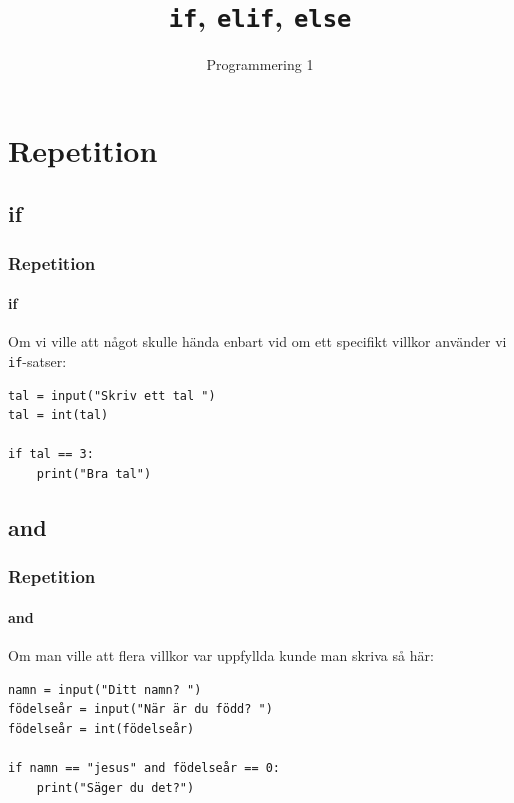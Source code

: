 \documentclass{beamer}
\begin{document}

\title{\texttt{if}, \texttt{elif}, \texttt{else}}

\author{Programmering 1}

\maketitle

\section{Repetition}

\subsection{if}

\begin{frame}[fragile]
\frametitle{Repetition}
\framesubtitle{if}

Om vi ville att något skulle hända enbart vid om ett specifikt villkor använder vi \texttt{if}-satser:

\begin{lstlisting}
tal = input("Skriv ett tal ")
tal = int(tal)

if tal == 3:
    print("Bra tal")
\end{lstlisting}


\end{frame}

\subsection{and}

\begin{frame}[fragile]
	\frametitle{Repetition}
	\framesubtitle{and}
	
	Om man ville att flera villkor var uppfyllda kunde man skriva så här:
	
	\begin{lstlisting}
namn = input("Ditt namn? ")
födelseår = input("När är du född? ")
födelseår = int(födelseår)

if namn == "jesus" and födelseår == 0:
    print("Säger du det?")
	\end{lstlisting}
	
\end{frame}
\end{document}
